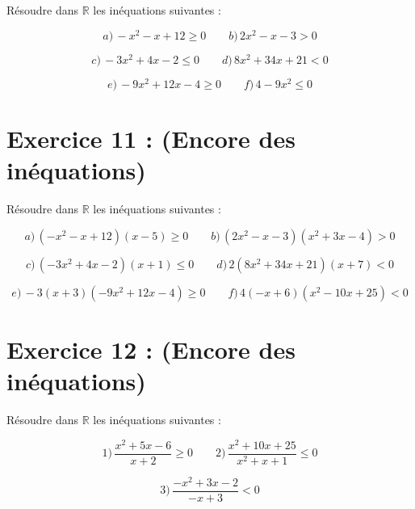 \documentclass[12pt]{article}
\begin{document}
Résoudre dans \(\mathbb{R}\) les inéquations suivantes :

\[
a) \, -x^2 - x + 12 \geq 0 \quad\quad b) \, 2x^2 - x - 3 > 0
\]

\[
c) \, -3x^2 + 4x - 2 \leq 0 \quad\quad d) \, 8x^2 + 34x + 21 < 0
\]

\[
e) \, -9x^2 + 12x - 4 \geq 0 \quad\quad f) \, 4 - 9x^2 \leq 0
\]

\section*{Exercice 11 : (Encore des inéquations)}

Résoudre dans \( \mathbb{R} \) les inéquations suivantes :

\[
a) \, (-x^2 - x + 12)(x - 5) \geq 0 \quad\quad b) \, (2x^2 - x - 3)(x^2 + 3x - 4) > 0
\]

\[
c) \, (-3x^2 + 4x - 2)(x + 1) \leq 0 \quad\quad d) \, 2(8x^2 + 34x + 21)(x + 7) < 0
\]

\[
e) \, -3(x + 3)(-9x^2 + 12x - 4) \geq 0 \quad\quad f) \, 4(-x + 6)(x^2 - 10x + 25) < 0
\]

\section*{Exercice 12 : (Encore des inéquations)}

Résoudre dans \( \mathbb{R} \) les inéquations suivantes :

\[
1) \, \frac{x^2 + 5x - 6}{x + 2} \geq 0 \quad\quad 2) \, \frac{x^2 + 10x + 25}{x^2 + x + 1} \leq 0
\]

\[
3) \, \frac{-x^2 + 3x - 2}{-x + 3} < 0
\]
\end{document}

